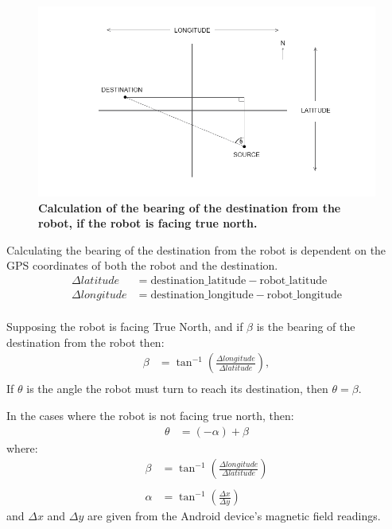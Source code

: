 \documentclass[titlepage,12pt,a4paper]{article}
\begin{document}
\pagebreak

\begin{figure}[h]
	\centering
	\includegraphics[scale=0.6]{bearings.png}
	\caption{\textbf{Calculation of the bearing of the destination from the robot, if the robot is facing true north.}}
\end{figure}

Calculating the bearing of the destination from the robot is dependent on the GPS coordinates of both the robot and the destination.
\begin{align*}
	\Delta{latitude}   	&= 	\text{destination\_latitude} - \text{robot\_latitude} \\
	\Delta{longitude}	&= 	\text{destination\_longitude} - \text{robot\_longitude} \\
\end{align*}

Supposing the robot is facing True North, and if $\beta$ is the bearing of the destination from the robot then:
\begin{align*}
	\beta		&=	\tan^{-1}({\frac{\Delta{longitude}}{\Delta{latitude}}}),\\
\end{align*}
If $\theta$ is the angle the robot must turn to reach its destination, then $\theta = \beta$.

\pagebreak

In the cases where the robot is not facing true north, then:
\begin{align*}
	\theta	&=	(-\alpha) + \beta
\end{align*}
where:
\begin{align*}
	\beta		&=	\tan^{-1}({\frac{\Delta{longitude}}{\Delta{latitude}}})\\ \\
	\alpha	&=	\tan^{-1}(\frac{\Delta{x}}{\Delta{y}})
\end{align*}
and $\Delta{x}$ and $\Delta{y}$ are given from the Android device's magnetic field readings.
\end{document}
